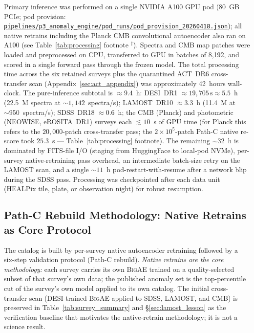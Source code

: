 \documentclass[aps,prd,twocolumn,superscriptaddress,showpacs,preprintnumbers,nofootinbib,longbibliography,floatfix]{revtex4-2}
\newcommand{\repoBase}{https://github.com/Hubify-Projects/bigbounce/blob/main}
\newcommand{\artifact}[1]{\href{\repoBase/#1}{\nolinkurl{#1}}}
\newcommand{\BigAE}{\textsc{BigAE}}
\begin{document}
Primary inference was performed on a single NVIDIA A100 GPU pod (80~GB PCIe; pod provision: \artifact{pipelines/p3\_anomaly\_engine/pod\_runs/pod\_provision\_20260418.json}); all native retrains including the Planck CMB convolutional autoencoder also ran on A100 (see Table~\ref{tab:processing} footnote $^\dagger$). Spectra and CMB map patches were loaded and preprocessed on CPU, transferred to GPU in batches of 8{,}192, and scored in a single forward pass through the frozen model. The total processing time across the six retained surveys plus the quarantined ACT~DR6 cross-transfer scan (Appendix~\ref{sec:act_appendix}) was approximately 42~hours wall-clock. The pure-inference subtotal is $\approx\!9.4$~h: DESI~DR1 $\approx\!19{,}705\,\text{s}\!\approx\!5.5$~h (22.5~M spectra at ${\sim}1{,}142$~spectra/s); LAMOST~DR10 $\approx\!3.3$~h (11.4~M at ${\sim}950$~spectra/s); SDSS~DR18 $\approx\!0.6$~h; the CMB (Planck) and photometric (NEOWISE, eROSITA~DR1) surveys each ${\lesssim}10$~s of GPU time (for Planck this refers to the $20{,}000$-patch cross-transfer pass; the $2\times10^5$-patch Path-C native re-score took $25.3$~s --- Table~\ref{tab:processing} footnote). The remaining ${\sim}32$~h is dominated by FITS-file I/O (staging from HuggingFace to local-pod NVMe), per-survey native-retraining pass overhead, an intermediate batch-size retry on the LAMOST scan, and a single ${\sim}11$~h pod-restart-with-resume after a network blip during the SDSS pass. Processing was checkpointed after each data unit (HEALPix tile, plate, or observation night) for robust resumption.


\subsection{Path-C Rebuild Methodology: Native Retrains as Core Protocol}\label{sec:pathc}

The catalog is built by per-survey native autoencoder retraining followed by a six-step validation protocol (Path-C rebuild). \emph{Native retrains are the core methodology:} each survey carries its own \BigAE{} trained on a quality-selected subset of that survey's own data; the published anomaly set is the top-percentile cut of the survey's own model applied to its own catalog. The initial cross-transfer scan (DESI-trained \BigAE{} applied to SDSS, LAMOST, and CMB) is preserved in Table~\ref{tab:survey_summary} and \S\ref{sec:lamost_lesson} as the verification baseline that motivates the native-retrain methodology; it is not a science result.
\end{document}
